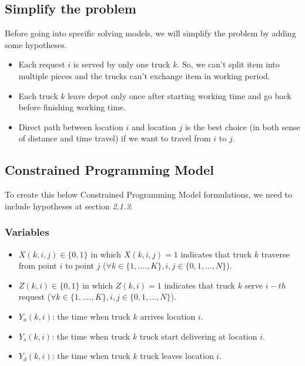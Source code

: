 \subsection{Simplify the problem}
Before going into specific solving models, we will simplify the problem by adding some hypotheses.
\begin{itemize}
	\item Each request $i$ is served by only one truck $k$. So, we can't split item into multiple pieces and the trucks can't exchange item in working period.
	\item Each truck $k$ leave depot only once after starting working time and go back before finishing working time.
	\item Direct path between location $i$ and location $j$ is the best choice (in both sense of distance and time travel) if we want to travel from $i$ to $j$.
\end{itemize}
\subsection{Constrained Programming Model}
To create this below Constrained Programming Model formulations, we need to include hypotheses at section \emph{2.1.3}:
\subsubsection{Variables}
\begin{itemize}
	\item $X(k,i,j)\in\{0,1\}$ in which $X(k,i,j)=1$ indicates that truck $k$ traverse from point $i$ to point $j$ ($\forall k\in \{1,.\dots,K\}, i,j\in\{0,1,\dots,N\}$).
	\item $Z(k, i)\in\{0,1\}$ in which $Z(k, i)=1$ indicates that truck $k$ serve $i-th$ request ($\forall k \in \{1,.\dots,K\}, i,j\in\{0,1,\dots,N\}$).
	\item $Y_{a}(k, i)$: the time when truck $k$ arrives location $i$.
	\item $Y_{s}(k, i)$: the time when truck $k$ truck start delivering at location $i$.
	\item $Y_{d}(k, i)$: the time when truck $k$ truck leaves location $i$.
\end{itemize}
